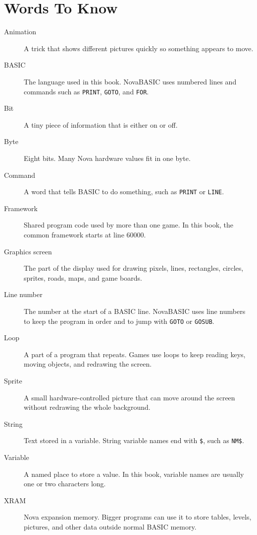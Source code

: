 \chapter*{Words To Know}
{}

\begin{description}
\item[Animation] A trick that shows different pictures quickly so something
appears to move.

\item[BASIC] The language used in this book. NovaBASIC uses numbered lines and
commands such as \texttt{PRINT}, \texttt{GOTO}, and \texttt{FOR}.

\item[Bit] A tiny piece of information that is either on or off.

\item[Byte] Eight bits. Many Nova hardware values fit in one byte.

\item[Command] A word that tells BASIC to do something, such as \texttt{PRINT}
or \texttt{LINE}.

\item[Framework] Shared program code used by more than one game. In this book,
the common framework starts at line 60000.

\item[Graphics screen] The part of the display used for drawing pixels, lines,
rectangles, circles, sprites, roads, maps, and game boards.

\item[Line number] The number at the start of a BASIC line. NovaBASIC uses line
numbers to keep the program in order and to jump with \texttt{GOTO} or
\texttt{GOSUB}.

\item[Loop] A part of a program that repeats. Games use loops to keep reading
keys, moving objects, and redrawing the screen.

\item[Sprite] A small hardware-controlled picture that can move around the
screen without redrawing the whole background.

\item[String] Text stored in a variable. String variable names end with
\texttt{\$}, such as \texttt{NM\$}.

\item[Variable] A named place to store a value. In this book, variable names
are usually one or two characters long.

\item[XRAM] Nova expansion memory. Bigger programs can use it to store tables,
levels, pictures, and other data outside normal BASIC memory.
\end{description}
